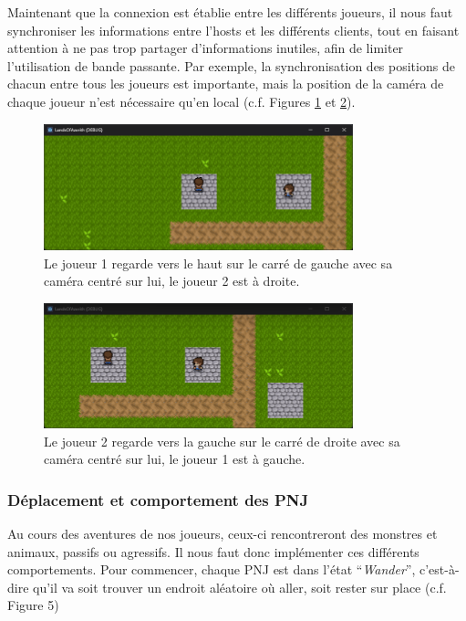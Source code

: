 Maintenant que la connexion est établie entre les différents joueurs, il nous faut synchroniser les informations entre l'hosts et les différents clients, tout en faisant attention à ne pas trop partager d'informations inutiles, afin de limiter l'utilisation de bande passante.
Par exemple, la synchronisation des positions de chacun entre tous les joueurs est importante, mais la position de la caméra de chaque joueur n'est nécessaire qu'en local (c.f. Figures \ref*{fig:gameplay3} et \ref*{fig:gameplay4}).

\begin{figure}[H]
    \centering
    \includegraphics[width=0.8\textwidth]{2.game/assets/gameplay3.png}
    \caption{Le joueur 1 regarde vers le haut sur le carré de gauche avec sa caméra centré sur lui, le joueur 2 est à droite.}
    \label{fig:gameplay3}
\end{figure}

\begin{figure}[H]
    \centering
    \includegraphics[width=0.8\textwidth]{2.game/assets/gameplay4.png}
    \caption{Le joueur 2 regarde vers la gauche sur le carré de droite avec sa caméra centré sur lui, le joueur 1 est à gauche.}
    \label{fig:gameplay4}
\end{figure}


\subsubsection*{Déplacement et comportement des PNJ}

Au cours des aventures de nos joueurs, ceux-ci rencontreront des monstres et animaux, passifs ou agressifs.
Il nous faut donc implémenter ces différents comportements.
Pour commencer, chaque PNJ est dans l'état “\textit{Wander}”, c'est-à-dire qu'il va soit trouver un endroit aléatoire où aller, soit rester sur place (c.f. Figure 5)

